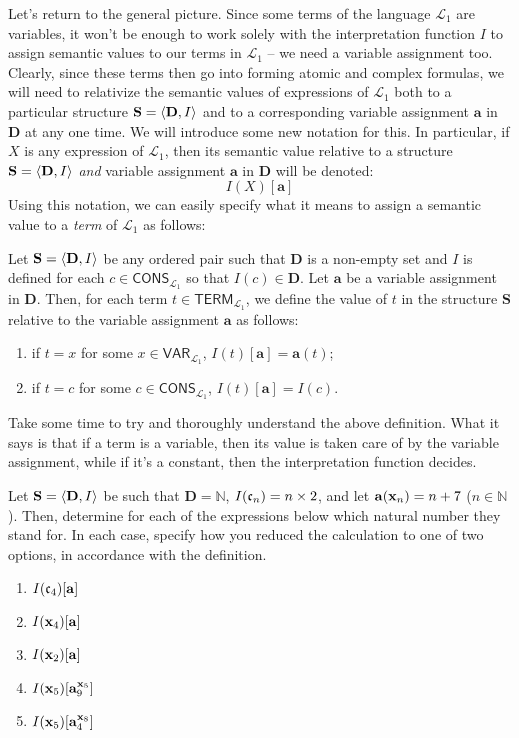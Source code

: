 Let's return to the general picture. Since some terms of the language $\mathcal{L}_1$ are variables, it won't be enough to work solely with the interpretation function $I$ to assign semantic values to our terms in $\mathcal{L}_1$ -- we need a variable assignment too. Clearly, since these terms then go into forming atomic and complex formulas, we will need to relativize the semantic values of expressions of $\mathcal{L}_1$ both to a particular structure $\mathbf{S}=\langle\mathbf{D}, I\rangle$ and to a corresponding variable assignment $\mathbf{a}$ in $\mathbf{D}$ at any one time. We will introduce some new notation for this. In particular, if $X$ is any expression of $\mathcal{L}_1$, then its semantic value relative to a structure $\mathbf{S}=\langle\mathbf{D}, I\rangle$ \textit{and} variable assignment $\mathbf{a}$ in $\mathbf{D}$ will be denoted:
\[
I(X)[\mathbf{a}]
\]
Using this notation, we can easily specify what it means to assign a semantic value to a \textit{term} of $\mathcal{L}_1$ as follows:
\begin{defn}
Let $\mathbf{S}=\langle\mathbf{D}, I\rangle$ be any ordered pair such that $\mathbf{D}$ is a non-empty set and $I$ is defined for each $c \in \mathsf{CONS}_{\mathcal{L}_1}$ so that $I(c) \in \mathbf{D}$. Let $\mathbf{a}$ be a variable assignment in $\mathbf{D}$. Then, for each term $t \in \mathsf{TERM}_{\mathcal{L}_1}$, we define the value of $t$ in the structure $\mathbf{S}$ relative to the variable assignment $\mathbf{a}$ as follows:
\begin{enumerate}
	\item if $t=x$ for some $x \in \textsf{VAR}_{\mathcal{L}_1}$, $I(t)[\mathbf{a}]=\mathbf{a}(t)$;
	\item if $t=c$ for some $c \in \textsf{CONS}_{\mathcal{L}_1}$, $I(t)[\mathbf{a}]=I(c)$.
\end{enumerate}
\end{defn}

\begin{remark}
Take some time to try and thoroughly understand the above definition. What it says is that if a term is a variable, then its value is taken care of by the variable assignment, while if it's a constant, then the interpretation function decides. 
\end{remark}

\begin{exc}
Let $\mathbf{S}=\langle\mathbf{D}, I\rangle$ be such that $\mathbf{D}=\mathbb{N}$, $I(\mathfrak{c}_{n})=n \times 2$, and let $\mathbf{a}(\mathbf{x}_{n})= n + 7$ ($n \in \mathbb{N}$). Then, determine for each of the expressions below which natural number they stand for. In each case, specify how you reduced the calculation to one of two options, in accordance with the definition. 
%
\begin{enumerate}
	\item $I(\mathfrak{c}_{4})[\mathbf{a}]$
	\item $I(\mathbf{x}_{4})[\mathbf{a}]$
	\item $I(\mathbf{x}_{2})[\mathbf{a}]$
	\item $I(\mathbf{x}_{5})[\mathbf{a}^{\mathbf{x}_{5}}_9]$
	\item $I(\mathbf{x}_{5})[\mathbf{a}^{\mathbf{x}_{8}}_4]$
\end{enumerate}
\end{exc}

